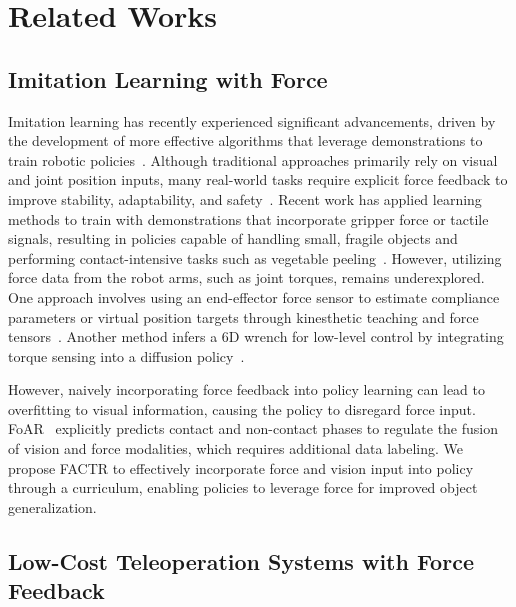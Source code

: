 \section{Related Works}
\subsection{Imitation Learning with Force}

Imitation learning has recently experienced significant advancements, driven by the development of more effective algorithms that leverage demonstrations to train robotic policies~\cite{mandlekar2021matters, chi2023diffusion}. Although traditional approaches primarily rely on visual and joint position inputs, many real-world tasks require explicit force feedback to improve stability, adaptability, and safety~\cite{mason1981compliance, hogan1984impedance}. 
Recent work has applied learning methods to train with demonstrations that incorporate gripper force or tactile signals, resulting in policies capable of handling small, fragile objects and performing contact-intensive tasks such as vegetable peeling~\cite{liu2024forcemimic, xie2024just, li2024haptic}. However, utilizing force data from the robot arms, such as joint torques, remains underexplored. One approach involves using an end-effector force sensor to estimate compliance parameters or virtual position targets through kinesthetic teaching and force tensors~\cite{hou2024adaptive, chen2025dexforce}. Another method infers a 6D wrench for low-level control by integrating torque sensing into a diffusion policy~\cite{wu2024tacdiffusion}.

However, naively incorporating force feedback into policy learning can lead to overfitting to visual information, causing the policy to disregard force input. FoAR~\cite{he2024foar} explicitly predicts contact and non-contact phases to regulate the fusion of vision and force modalities, which requires additional data labeling. We propose FACTR to effectively incorporate force and vision input into policy through a curriculum, enabling policies to leverage force for improved object generalization.

\subsection{Low-Cost Teleoperation Systems with Force Feedback}

